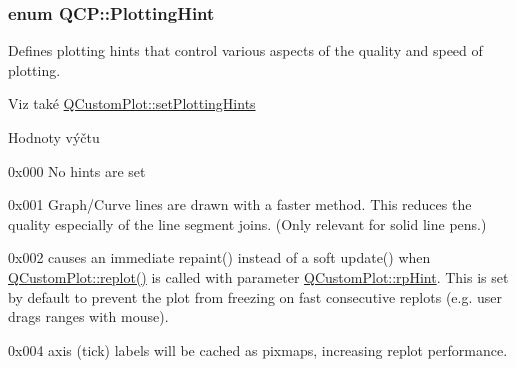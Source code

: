 \subsubsection[{Plotting\+Hint}]{\setlength{\rightskip}{0pt plus 5cm}enum {\bf Q\+C\+P\+::\+Plotting\+Hint}}\label{namespaceQCP_a5400e5fcb9528d92002ddb938c1f4ef4}


Defines plotting hints that control various aspects of the quality and speed of plotting. 

\begin{DoxySeeAlso}{Viz také}
\hyperlink{classQCustomPlot_a94a33cbdadbbac5934843508bcfc210d}{Q\+Custom\+Plot\+::set\+Plotting\+Hints} 
\end{DoxySeeAlso}
\begin{Desc}
\item[Hodnoty výčtu]\par
\begin{description}
\item[{\em 
\hypertarget{namespaceQCP_a5400e5fcb9528d92002ddb938c1f4ef4ab7283c5bfc1ba9e597015389880bda42}{}ph\+None\label{namespaceQCP_a5400e5fcb9528d92002ddb938c1f4ef4ab7283c5bfc1ba9e597015389880bda42}
}]{\ttfamily 0x000} No hints are set \item[{\em 
\hypertarget{namespaceQCP_a5400e5fcb9528d92002ddb938c1f4ef4aa5fd227bc878c56ad2a87ea32c74ee4d}{}ph\+Fast\+Polylines\label{namespaceQCP_a5400e5fcb9528d92002ddb938c1f4ef4aa5fd227bc878c56ad2a87ea32c74ee4d}
}]{\ttfamily 0x001} Graph/\+Curve lines are drawn with a faster method. This reduces the quality especially of the line segment joins. (Only relevant for solid line pens.) \item[{\em 
\hypertarget{namespaceQCP_a5400e5fcb9528d92002ddb938c1f4ef4aa3090dafa0e0f9a28c579c79d6c2d283}{}ph\+Force\+Repaint\label{namespaceQCP_a5400e5fcb9528d92002ddb938c1f4ef4aa3090dafa0e0f9a28c579c79d6c2d283}
}]{\ttfamily 0x002} causes an immediate repaint() instead of a soft update() when \hyperlink{classQCustomPlot_a606fd384b2a637ce2c24899bcbde77d6}{Q\+Custom\+Plot\+::replot()} is called with parameter \hyperlink{classQCustomPlot_a45d61392d13042e712a956d27762aa39adfa1f2387617168d9299f4c8ad15b332}{Q\+Custom\+Plot\+::rp\+Hint}. This is set by default to prevent the plot from freezing on fast consecutive replots (e.\+g. user drags ranges with mouse). \item[{\em 
\hypertarget{namespaceQCP_a5400e5fcb9528d92002ddb938c1f4ef4a8e9cfe5ee0c5cd36dd7accf9739aff65}{}ph\+Cache\+Labels\label{namespaceQCP_a5400e5fcb9528d92002ddb938c1f4ef4a8e9cfe5ee0c5cd36dd7accf9739aff65}
}]{\ttfamily 0x004} axis (tick) labels will be cached as pixmaps, increasing replot performance. \end{description}
\end{Desc}
